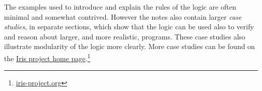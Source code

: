 The examples used to introduce and explain the rules of the logic are often minimal and somewhat contrived.
However the notes also contain larger \emph{case studies}, in separate sections, which show that the logic can be used also to verify and reason about larger, and more realistic, programs.
These case studies also illustrate modularity of the logic more clearly.
More case studies can be found on the \href{http://iris-project.org}{Iris project home page}.\footnote{\href{http://iris-project.org}{iris-project.org}}


